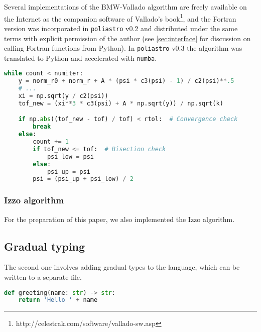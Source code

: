 Several implementations of the BMW-Vallado algorithm are freely available on the Internet as the companion software of Vallado's book\footnote{http://celestrak.com/software/vallado-sw.asp}, and the Fortran version was incorporated in \verb|poliastro| v0.2 and distributed under the same terms with explicit permission of the author (see \ref{sec:interface} for discussion on calling Fortran functions from Python). In \verb|poliastro| v0.3 the algorithm was translated to Python and accelerated with \verb|numba|.

\begin{lstlisting}[language=Python]
while count < numiter:
    y = norm_r0 + norm_r + A * (psi * c3(psi) - 1) / c2(psi)**.5
    # ...
    xi = np.sqrt(y / c2(psi))
    tof_new = (xi**3 * c3(psi) + A * np.sqrt(y)) / np.sqrt(k)

    if np.abs((tof_new - tof) / tof) < rtol:  # Convergence check
        break
    else:
        count += 1
        if tof_new <= tof:  # Bisection check
            psi_low = psi
        else:
            psi_up = psi
        psi = (psi_up + psi_low) / 2
\end{lstlisting}


\subsubsection{Izzo algorithm}

For the preparation of this paper, we also implemented the Izzo algorithm.

\subsection{Gradual typing}

The second one involves adding gradual types to the language, which can be written to a separate file.

\begin{lstlisting}[language=Python]
def greeting(name: str) -> str:
    return 'Hello ' + name
\end{lstlisting}